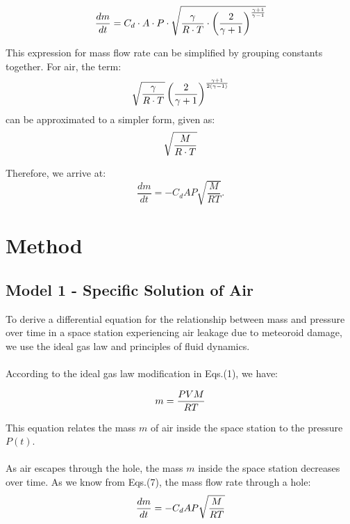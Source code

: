 \begin{equation}\notag
\frac{dm}{dt} = C_d \cdot A \cdot P \cdot \sqrt{\frac{\gamma}{R \cdot T} \cdot \left( \frac{2}{\gamma + 1} \right)^{\frac{\gamma + 1}{\gamma - 1}}}
\end{equation}

This expression for mass flow rate can be simplified by grouping constants together. For air, the term:
\begin{equation}
    \sqrt{\frac{\gamma}{R \cdot T}} \left( \frac{2}{\gamma + 1} \right)^{\frac{\gamma + 1}{2(\gamma - 1)}}
    \notag
\end{equation}
can be approximated to a simpler form, given as:
\begin{equation}
    \sqrt{\frac{M}{R \cdot T}}
    \notag
\end{equation}

Therefore, we arrive at:
\begin{equation}
    \frac{dm}{dt} = -C_d A P \sqrt{\frac{M}{R T}}.
\end{equation}

\section{Method}

\subsection{Model 1 - Specific Solution of Air}
To derive a differential equation for the relationship between mass and pressure over time in a space station experiencing air leakage due to meteoroid damage, we use the ideal gas law and principles of fluid dynamics.
\\\\
According to the ideal gas law modification in Eqs.(1),  we have:

\begin{equation}
    m = \frac{PVM}{RT}
    \notag
\end{equation}

This equation relates the mass $m$ of air inside the space station to the pressure $P(t)$.
\\\\


As air escapes through the hole, the mass $m$ inside the space station decreases over time. As we know from Eqs.(7), the mass flow rate through a hole:
\begin{equation}
    \frac{dm}{dt} = -C_d A P \sqrt{\frac{M}{RT}}
    \notag
\end{equation}


